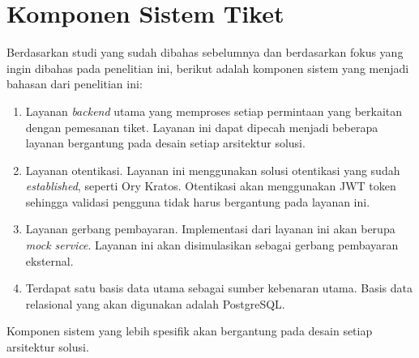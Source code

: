 
\section{Komponen Sistem Tiket}

Berdasarkan studi yang sudah dibahas sebelumnya dan berdasarkan fokus yang ingin dibahas pada penelitian ini, berikut adalah komponen sistem yang menjadi bahasan dari penelitian ini:

\begin{enumerate}
    \item Layanan \textit{backend} utama yang memproses setiap permintaan yang berkaitan dengan pemesanan tiket. Layanan ini dapat dipecah menjadi beberapa layanan bergantung pada desain setiap arsitektur solusi.
    \item Layanan otentikasi. Layanan ini menggunakan solusi otentikasi yang sudah \textit{established}, seperti Ory Kratos. Otentikasi akan menggunakan JWT token sehingga validasi pengguna tidak harus bergantung pada layanan ini.
    \item Layanan gerbang pembayaran. Implementasi dari layanan ini akan berupa \textit{mock service}. Layanan ini akan disimulasikan sebagai gerbang pembayaran eksternal.
    \item Terdapat satu basis data utama sebagai sumber kebenaran utama. Basis data relasional yang akan digunakan adalah PostgreSQL.
\end{enumerate}

Komponen sistem yang lebih spesifik akan bergantung pada desain setiap arsitektur solusi.